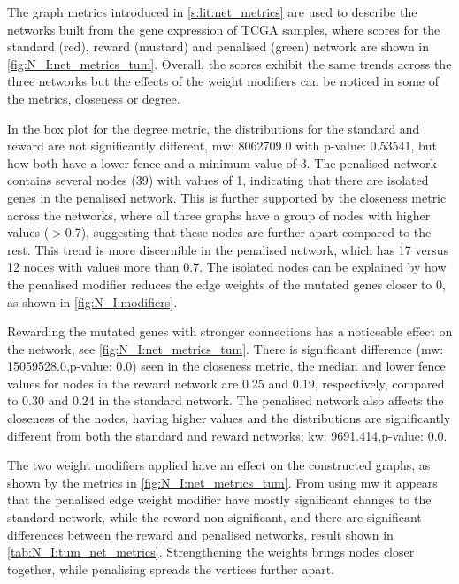 The graph metrics introduced in \cref{s:lit:net_metrics} are used to describe the networks built from the gene expression of TCGA samples, where scores for the standard (red), reward (mustard) and penalised (green) network are shown in \cref{fig:N_I:net_metrics_tum}. Overall, the scores exhibit the same trends across the three networks but the effects of the weight modifiers can be noticed in some of the metrics, closeness or degree.

In the box plot for the degree metric, the distributions for the standard and reward are not significantly different, \acrfull{mw}: 8062709.0 with p-value: 0.53541, but how both have a lower fence and a minimum value of 3. The penalised network contains several nodes (39) with values of 1, indicating that there are isolated genes in the penalised network. This is further supported by the closeness metric across the networks, where all three graphs have a group of nodes with higher values ($>$0.7), suggesting that these nodes are further apart compared to the rest. This trend is more discernible in the penalised network, which has 17 versus 12 nodes with values more than 0.7. The isolated nodes can be explained by how the penalised modifier reduces the edge weights of the mutated genes closer to 0, as shown in \cref{fig:N_I:modifiers}.

Rewarding the mutated genes with stronger connections has a noticeable effect on the network, see \cref{fig:N_I:net_metrics_tum}. There is significant difference (\acrshort{mw}: 15059528.0,p-value: 0.0) seen in the closeness metric, the median and lower fence values for nodes in the reward network are $0.25$ and $0.19$, respectively, compared to $0.30$ and $0.24$ in the standard network. The penalised network also affects the closeness of the nodes, having higher values and the distributions are significantly different from both the standard and reward networks; \acrfull{kw}: 9691.414,p-value: 0.0. 

The two weight modifiers applied have an effect on the constructed graphs, as shown by the metrics in \cref{fig:N_I:net_metrics_tum}. From using \acrlong{mw} it appears that the penalised edge weight modifier have mostly significant changes to the standard network, while the reward non-significant, and there are significant differences between the reward and penalised networks, result shown in \cref{tab:N_I:tum_net_metrics}. Strengthening the weights brings nodes closer together, while penalising spreads the vertices further apart. 

